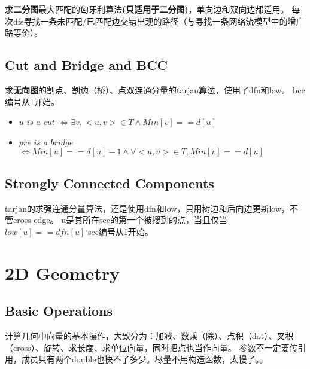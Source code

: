 \documentclass[twoside, UTF8]{article}
\begin{document}
			\begin{flushleft}
				求\textbf{二分图}最大匹配的匈牙利算法\textbf{(只适用于二分图)}，单向边和双向边都适用。
				\linebreak 每次dfs寻找一条未匹配/已匹配边交错出现的路径（与寻找一条网络流模型中的增广路等价）。
			\end{flushleft}
			
		\newpage
		\subsection{Cut and Bridge and BCC}
			\begin{flushleft}
				求\textbf{无向图}的割点、割边（桥）、点双连通分量的tarjan算法，使用了dfn和low。
				\linebreak bcc编号从1开始。
			\end{flushleft}
			
			\begin{itemize}
				\item $u$ $is$ $a$ $cut$ $\Leftrightarrow \exists v, <u, v> \in T \wedge Min[v] == d[u]$
				\item $pre$ $is$ $a$ $bridge$ $\Leftrightarrow Min[u] == d[u] - 1 \wedge \forall <u, v> \in T, Min[v] == d[u]$
			\end{itemize}
		\newpage
		\subsection{Strongly Connected Components}
			\begin{flushleft}
				tarjan的求强连通分量算法，还是使用dfn和low，只用树边和后向边更新low，不管cross-edge。
				\linebreak u是其所在scc的第一个被搜到的点，当且仅当$low[u] == dfn[u]$
				\linebreak scc编号从1开始。
			\end{flushleft}
			
	\newpage
	\section{2D Geometry}
		\subsection{Basic Operations}
			\begin{flushleft}
				计算几何中向量的基本操作，大致分为：加减、数乘（除）、点积（dot）、叉积（cross）、旋转、求长度、求单位向量，同时把点也当作向量。
				\linebreak 参数不一定要传引用，成员只有两个double也快不了多少。尽量不用构造函数，太慢了。。
			\end{flushleft}
			
\end{document}
